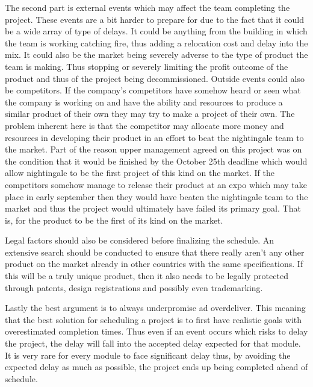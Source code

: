 \documentclass{article}
\begin{document}
The second part is external events which may affect the team completing the project. These events are a bit harder to prepare for due to the fact that it could be a wide array of type of delays. It could be anything from the building in which the team is working catching fire, thus adding a relocation cost and delay into the mix. It could also be the market being severely adverse to the type of product the team is making. Thus stopping or severely limiting the profit outcome of the product and thus of the project being decommissioned.
Outside events could also be competitors. If the company's competitors have somehow heard or seen what the company is working on and have the ability and resources to produce a similar product of their own they may try to make a project of their own. The problem inherent here is that the competitor may allocate more money and resources in developing their product in an effort to beat the nightingale team to the market. Part of the reason upper management agreed on this project was on the condition that it would be finished by the October 25th deadline which would allow nightingale to be the first project of this kind on the market. If the competitors somehow manage to release their product at an expo which may take place in early september then they would have beaten the nightingale team to the market and thus the project would ultimately have failed its primary goal. That is, for the product to be the first of its kind on the market.


Legal factors should also be considered before finalizing the schedule. An extensive search should be conducted to ensure that there really aren't any other product on the market already in other countries with the same specifications.
If this will be a truly unique product, then it also needs to be legally protected through patents, design registrations and possibly even trademarking.




Lastly the best argument is to always underpromise ad overdeliver. This meaning that the best solution for scheduling a project is to first have realistic goals with overestimated completion times. Thus even if an event occurs which risks to delay the project, the delay will fall into the accepted delay expected for that module. It is very rare for every module to face significant delay thus, by avoiding the expected delay as much as possible, the project ends up being completed ahead of schedule.


\pagebreak
\end{document}
